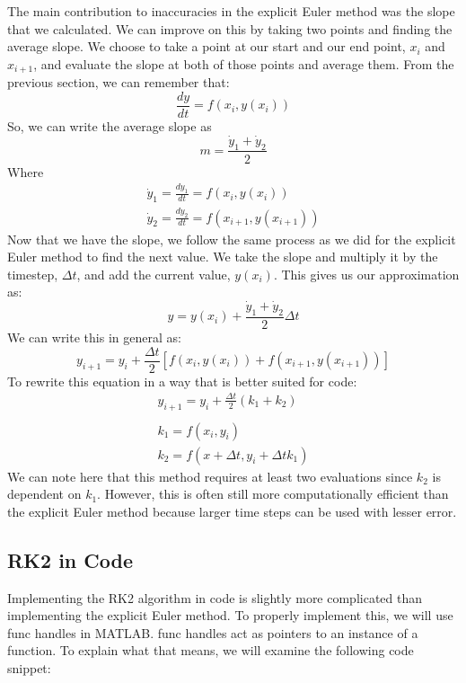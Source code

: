 \documentclass[10pt, openany, titlepage]{book}
\theoremstyle{definition}
\begin{document}
The main contribution to inaccuracies in the explicit Euler method was the slope that we calculated. We can improve on this by taking two points and finding the average slope. We choose to take a point at our start and our end point, $x_i$ and $x_{i+1}$, and evaluate the slope at both of those points and average them. From the previous section, we can remember that:
\begin{equation}
    \frac{dy}{dt}=f\left(x_i,y(x_i)\right)
\end{equation}
So, we can write the average slope as
\begin{equation}
    m=\frac{\dot{y}_1+\dot{y}_2}{2}
\end{equation}
Where
\begin{gather}
    \dot{y}_1=\frac{dy_1}{dt}=f\left(x_i,y(x_i)\right)\\
    \dot{y}_2=\frac{dy_2}{dt}=f\left(x_{i+1},y(x_{i+1})\right)
\end{gather}
Now that we have the slope, we follow the same process as we did for the explicit Euler method to find the next value. We take the slope and multiply it by the timestep, $\Delta t$, and add the current value, $y(x_i)$. This gives us our approximation as:
\begin{equation}
    y=y(x_i)+\frac{\dot{y}_1+\dot{y}_2}{2}\Delta t
\end{equation}
We can write this in general as:
\begin{equation}
    y_{i+1}=y_i+\frac{\Delta t}{2}\left[f(x_i,y(x_i))+f(x_{i+1},y(x_{i+1}))\right]
\end{equation}
To rewrite this equation in a way that is better suited for code:
\begin{gather}\label{eq:rk2}
    y_{i+1}=y_i+\frac{\Delta t}{2}(k_1+k_2)\\\\
    k_1=f(x_i,y_i)\\
    k_2=f(x+\Delta t, y_i+\Delta tk_1)
\end{gather}
We can note here that this method requires at least two evaluations since $k_2$ is dependent on $k_1$. However, this is often still more computationally efficient than the explicit Euler method because larger time steps can be used with lesser error.

\subsection{RK2 in Code}
Implementing the RK2 algorithm in code is slightly more complicated than implementing the explicit Euler method. To properly implement this, we will use \glspl{func handle} in MATLAB. \Glspl{func handle} act as pointers to an instance of a function. To explain what that means, we will examine the following code snippet:
\end{document}
